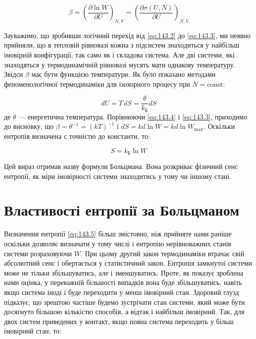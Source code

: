 \begin{equation}
	\beta=\left(\frac{\partial\ln{W}}{\partial U}\right)_{N,V}=\left(\frac{\partial\sigma\left(U,N\right)}{\partial U}\right)_{N,V}
	\label{eq:143.3}
\end{equation}

Зауважимо, що зробивши логічний перехід від \eqref{eq:143.2} до \eqref{eq:143.3}, ми неявно прийняли, що в тепловій рівновазі кожна з підсистем знаходиться у найбільш імовірній конфігурації, так само як і складова система. Але дві системи, які знаходяться у термодинамічній рівновазі мусять мати однакову температуру. Звідси $\beta$ має бути функцією температури. Як було показано методами феноменологічної термодинаміки для ізохорного процесу при $N = \text{const}$:

\begin{equation}
	dU = T \, dS = \frac{\theta}{k_\text{Б}}dS
	\label{eq:143.4}
\end{equation}
%
де $\theta$ --- енергетична температура. Порівнюючи \eqref{eq:143.4} і \eqref{eq:143.3}, приходимо до висновку, що $\beta = \theta^{-1} = (k T)^{-1}$ і $dS = k d \ln W = k d \ln W_{\max}$. Оскільки ентропія визначена с точністю до константи, то:

\begin{equation}
	S = k_\text{Б} \ln W
	\label{eq:143.5}
\end{equation}

Цей вираз отримав назву формули Больцмана. Вона розкриває фізичний сенс ентропії, як міри імовірності системи знаходитись у тому чи іншому стані.

\section{Властивості ентропії за Больцманом}

Визначення ентропії \eqref{eq:143.5} більш змістовно, ніж прийняте нами раніше оскільки дозволяє визначати у тому числі і ентропію нерівноважних станів системи розраховуючи $W$. При цьому другий закон термодинаміки втрачає свій абсолютний сенс і обертається у статистичний закон. Ентропія замкнутої системи може не тільки збільшуватись, але і зменшуватись. Проте, як показує зроблена нами оцінка, у переважній більшості випадків вона буде збільшуватись, навіть якщо система іноді і буде переходити у менш імовірний стан. Здоровий глузд підказує, що зрештою частіше будемо зустрічати стан системи, який може бути досягнуто більшою кількістю способів, а відтак і найбільш імовірний. Так, для двох систем приведених у контакт, якщо повна система переходить у більш імовірний стан, то:

